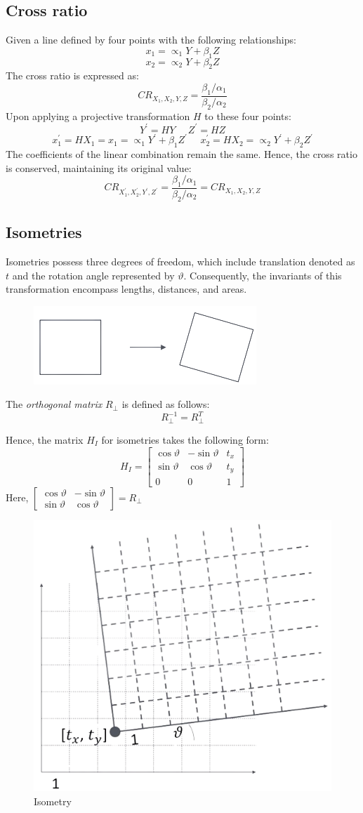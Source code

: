 \documentclass[12pt, a4paper]{report}
\begin{document}
    \subsection{Cross ratio}
    Given a line defined by four points with the following relationships:
    \[x_1=\propto_1Y+\beta_1Z\]
    \[x_2=\propto_2Y+\beta_2Z\]
    The cross ratio is expressed as:
    \[CR_{X_1,X_2,Y,Z}=\dfrac{\beta_1/\alpha_1}{\beta_2/\alpha_2}\]
    Upon applying a projective transformation $H$ to these four points:
    \[Y^{'}=HY \:\:\:\:\:\: Z^{'}=HZ\] 
    \[x^{'}_1=HX_1=x_1=\propto_1Y^{'}+\beta_1Z^{'} \:\:\:\:\:\: x^{'}_2=HX_2=\propto_2Y^{'}+\beta_2Z^{'}\]
    The coefficients of the linear combination remain the same. 
    Hence, the cross ratio is conserved, maintaining its original value:
    \[CR_{X_1^{'},X_2^{'},Y^{'},Z^{'}}=\dfrac{\beta_1/\alpha_1}{\beta_2/\alpha_2}=CR_{X_1,X_2,Y,Z}\]

    \subsection{Isometries}
    Isometries possess three degrees of freedom, which include translation denoted as $t$ and the rotation angle represented by $\vartheta$. 
    Consequently, the invariants of this transformation encompass lengths, distances, and areas.
    \begin{figure}[H]
        \centering
        \includegraphics[width=0.25\linewidth]{images/isometry.png}
    \end{figure}
    \begin{definition}
        The \emph{orthogonal matrix} $R_{\perp}$ is defined as follows: 
        \[R_{\perp}^{-1}=R_{\perp}^{T}\]
    \end{definition}
    Hence, the matrix $H_I$ for isometries takes the following form:
    \[H_I=
    \begin{bmatrix}
        \cos \vartheta & -\sin \vartheta & t_x \\
        \sin \vartheta & \cos \vartheta & t_y \\
        0 & 0 & 1
    \end{bmatrix}\]
    Here, $
    \begin{bmatrix}
        \cos \vartheta & -\sin \vartheta \\
        \sin \vartheta & \cos \vartheta
    \end{bmatrix}
    =R_{\perp}$
    \begin{figure}[H]
        \centering
        \includegraphics[width=0.25\linewidth]{images/isometry1.png}
        \caption{Isometry}
    \end{figure}
\end{document}
